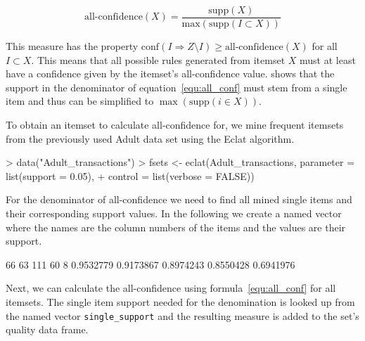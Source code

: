 \documentclass[10pt,a4paper]{article}
\newcommand{\code}[1]{\texttt{#1}}
\begin{document}
\begin{equation}
\mbox{all-confidence}(X) = \frac{\mathrm{supp}(X)}
{\mathrm{max}(\mathrm{supp}(I \subset X))}
\label{equ:all_conf}
\end{equation}

This measure has the property $\mathrm{conf}(I \Rightarrow Z \setminus
I) \ge \mbox{all-confidence}(X)$ for all $I \subset X$.  This means that
all possible rules generated from itemset $X$ must at least have a
confidence given by the itemset's all-confidence value.
\cite{arules:Omiecinski:2003} shows that the support in the denominator
of equation~\ref{equ:all_conf} must stem from a single item and thus can
be simplified to $\max(\mathrm{supp}(i \in X))$.

To obtain an itemset to calculate all-confidence for, 
we mine frequent itemsets from the previously used
Adult data set using the Eclat algorithm.

\begin{Schunk}
\begin{Sinput}
> data("Adult_transactions")
> fsets <- eclat(Adult_transactions, parameter = list(support = 0.05), 
+     control = list(verbose = FALSE))
\end{Sinput}
\end{Schunk}

For the denominator of all-confidence we need to find all mined single
items and their corresponding support values. In the following we 
create a named vector where the names are the column numbers of the 
items and the values are their support.

\begin{Schunk}
\begin{Soutput}
       66        63       111        60         8 
0.9532779 0.9173867 0.8974243 0.8550428 0.6941976 

\end{Soutput}
\end{Schunk}

Next, we can calculate the all-confidence 
using formula~\ref{equ:all_conf} for all itemsets.
The single item support needed for the denomination is looked up from the
named vector \code{single\_support} 
and the resulting measure is added to the set's quality data frame.
\end{document}
